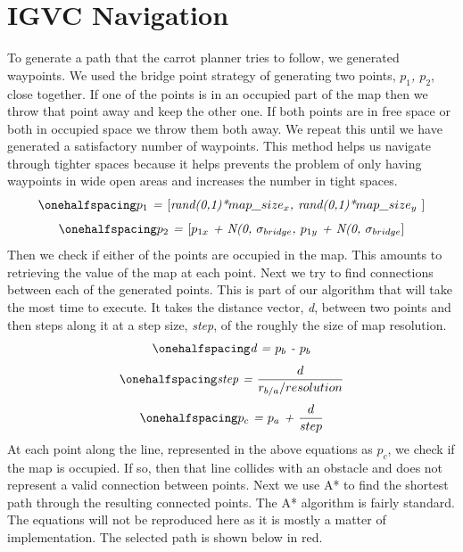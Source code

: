 \documentclass[12pt]{article}
\begin{document}
\newpage
\singlespacing
\section{IGVC Navigation}
\setlength{\parindent}{1cm}

To generate a path that the carrot planner tries to follow, we generated waypoints. We used the bridge point strategy of generating two points, \textit{$p_1$, $p_2$}, close together. If one of the points is in an occupied part of the map then we throw that point away and keep the other one. If both points are in free space or both in occupied space we throw them both away. We repeat this until we have generated a satisfactory number of waypoints. This method helps us navigate through tighter spaces because it helps prevents the problem of only having waypoints in wide open areas and increases the number in tight spaces. 
\begin{equation}
\onehalfspacing
\centering
\emph{$p_1$ = \textnormal{\lbrack}rand(0,1)*$map\_size_x$, rand(0,1)*$map\_size_y$ \textnormal{\rbrack}}
\end{equation}
\begin{equation}
\onehalfspacing
\centering
\emph{$p_2$ = \textnormal{\lbrack}$p_{1x}$ + N(0, $\sigma_{bridge}$, $p_{1y}$ + N(0, $\sigma_{bridge}$\textnormal{\rbrack}}
\end{equation}
Then we check if either of the points are occupied in the map. This amounts to retrieving the value of the map at each point. Next we try to find connections between each of the generated points. This is part of our algorithm that will take the most time to execute. It takes the distance vector, \textit{d}, between two points and then steps along it at a step size, \textit{step}, of the roughly the size of map resolution.
\begin{equation}
\onehalfspacing
\centering
\emph{d = $p_b$ - $p_b$}
\end{equation} 
\begin{equation}
\onehalfspacing
\centering
\emph{step = $\frac{d}{r_{b/a}/resolution}$}
\end{equation} 
\begin{equation}
\onehalfspacing
\centering
\emph{$p_c$ = $p_a$ + $\frac{d}{step}$}
\end{equation} 
At each point along the line, represented in the above equations as \textit{$p_c$}, we check if the map is occupied. If so, then that line collides with an obstacle and does not represent a valid connection between points. Next we use A* to find the shortest path through the resulting connected points. The A* algorithm is fairly standard. The equations will not be reproduced here as it is mostly a matter of implementation. The selected path is shown below in red.
\end{document}
